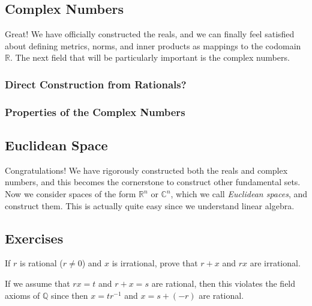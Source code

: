 \documentclass{article}
\begin{document}
      \begin{theorem}[Denseness]
        
      \end{theorem}
     
  \subsection{Complex Numbers} 

    Great! We have officially constructed the reals, and we can finally feel satisfied about defining metrics, norms, and inner products as mappings to the codomain $\mathbb{R}$. The next field that will be particularly important is the complex numbers. 

    \subsubsection{Direct Construction from Rationals?}

    \subsubsection{Properties of the Complex Numbers} 

  \subsection{Euclidean Space} 

    Congratulations! We have rigorously constructed both the reals and complex numbers, and this becomes the cornerstone to construct other fundamental sets. Now we consider spaces of the form $\mathbb{R}^n$ or $\mathbb{C}^n$, which we call \textit{Euclidean spaces}, and construct them. This is actually quite easy since we understand linear algebra. 

  \subsection{Exercises} 

    \begin{exercise}[Rudin 1.1]
    If $r$ is rational ($r \neq 0$) and $x$ is irrational, prove that $r + x$ and $rx$ are irrational. 
    \end{exercise}
    \begin{solution}
    If we assume that $r x = t$ and $r + x = s$ are rational, then this violates the field axioms of $\mathbb{Q}$ since then $x = t r^{-1}$ and $x = s + (-r)$ are rational. 
    \end{solution}
\end{document}
